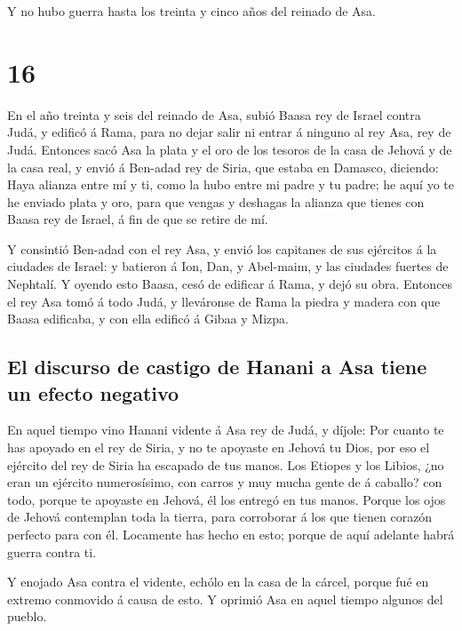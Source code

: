 Y no hubo guerra hasta los treinta y cinco años del
reinado de Asa.

\hypertarget{section-15}{%
\section{16}\label{section-15}}

 En el año treinta y seis del reinado de Asa, subió Baasa
rey de Israel contra Judá, y edificó á Rama, para no dejar salir ni
entrar á ninguno al rey Asa, rey de Judá.  Entonces sacó
Asa la plata y el oro de los tesoros de la casa de Jehová y de la casa
real, y envió á Ben-adad rey de Siria, que estaba en Damasco, diciendo:
 Haya alianza entre mí y ti, como la hubo entre mi padre y
tu padre; he aquí yo te he enviado plata y oro, para que vengas y
deshagas la alianza que tienes con Baasa rey de Israel, á fin de que se
retire de mí.

 Y consintió Ben-adad con el rey Asa, y envió los
capitanes de sus ejércitos á la ciudades de Israel: y batieron á Ion,
Dan, y Abel-maim, y las ciudades fuertes de Nephtalí.  Y
oyendo esto Baasa, cesó de edificar á Rama, y dejó su obra.
 Entonces el rey Asa tomó á todo Judá, y lleváronse de
Rama la piedra y madera con que Baasa edificaba, y con ella edificó á
Gibaa y Mizpa.

\hypertarget{el-discurso-de-castigo-de-hanani-a-asa-tiene-un-efecto-negativo}{%
\subsection{El discurso de castigo de Hanani a Asa tiene un efecto
negativo}\label{el-discurso-de-castigo-de-hanani-a-asa-tiene-un-efecto-negativo}}

 En aquel tiempo vino Hanani vidente á Asa rey de Judá, y
díjole: Por cuanto te has apoyado en el rey de Siria, y no te apoyaste
en Jehová tu Dios, por eso el ejército del rey de Siria ha escapado de
tus manos.  Los Etiopes y los Libios, ¿no eran un ejército
numerosísimo, con carros y muy mucha gente de á caballo? con todo,
porque te apoyaste en Jehová, él los entregó en tus manos.
 Porque los ojos de Jehová contemplan toda la tierra, para
corroborar á los que tienen corazón perfecto para con él. Locamente has
hecho en esto; porque de aquí adelante habrá guerra contra ti.

 Y enojado Asa contra el vidente, echólo en la casa de la
cárcel, porque fué en extremo conmovido á causa de esto. Y oprimió Asa
en aquel tiempo algunos del pueblo.

